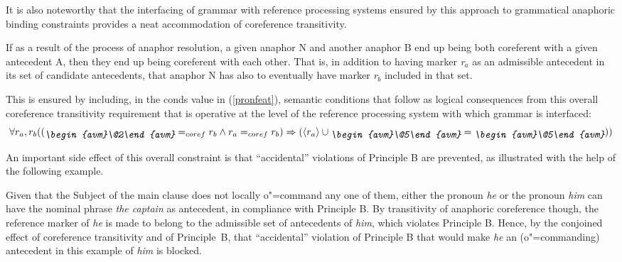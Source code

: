 \documentclass[output=paper
,modfonts
,nonflat]{langsci/langscibook}
\begin{document}
It is also noteworthy that the interfacing of grammar with reference processing systems
ensured by this approach to grammatical anaphoric binding constraints
provides a neat accommodation of coreference transitivity.

If as a result of the process of anaphor resolution, a given anaphor N and another anaphor B 
end up being both coreferent with a given antecedent A, then they end up being coreferent 
with each other. That is, in addition to having marker \emph{r$_{a}$} as an admissible antecedent
in its set of candidate antecedents, that anaphor N has also to eventually have marker \emph{r$_{b}$} 
included in that set.

This is ensured by including, in the {\sc conds} value in (\ref{pronfeat}), semantic conditions 
that follow as logical consequences from this overall coreference transitivity requirement that
is operative at the level of the reference processing system with which grammar is interfaced:
$$\forall r_{a},r_{b} ((\raisebox{-.6ex}{\em \begin{avm}\@2\end{avm}}=_{coref}r_{b}
\wedge r_{a}=_{coref}r_{b})
\Rightarrow (\langle r_{a}\rangle \cup\raisebox{-.6ex}{\em
\begin{avm}\@5\end{avm}} = \raisebox{-.6ex}{\em
\begin{avm}\@5\end{avm}}))$$


An important side effect of this overall constraint is  that ``accidental''
violations of Principle B are prevented, as illustrated with the help of the following example.

 \begin{exe}
\end{exe}

Given that the Subject of the main clause does not locally o"=command any one of them,
either the pronoun \emph{he} or the pronoun \emph{him} can have the nominal phrase
\emph{the captain} as antecedent, in compliance with Principle B. 
By transitivity of anaphoric coreference though, the reference marker 
of \emph{he} is made to belong to the admissible set of antecedents of \emph{him},
which violates Principle B. Hence, by the conjoined effect
of coreference transitivity and of Principle~B, that ``accidental'' violation
of Principle B that would make \emph{he} an (o"=commanding)
antecedent in this example of \emph{him} is blocked.
\end{document}
